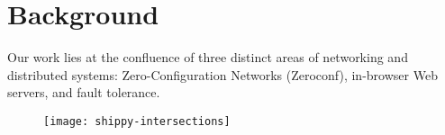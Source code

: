 \section{Background}
\label{sec:background}

Our work lies at the confluence of three distinct areas of networking and distributed systems: Zero-Configuration Networks (Zeroconf), in-browser Web servers, and fault tolerance.

\begin{figure}[h]
      \centering
      \texttt{[image: shippy-intersections]}
      \label{fig:stack}
\end{figure}



%

%



%



